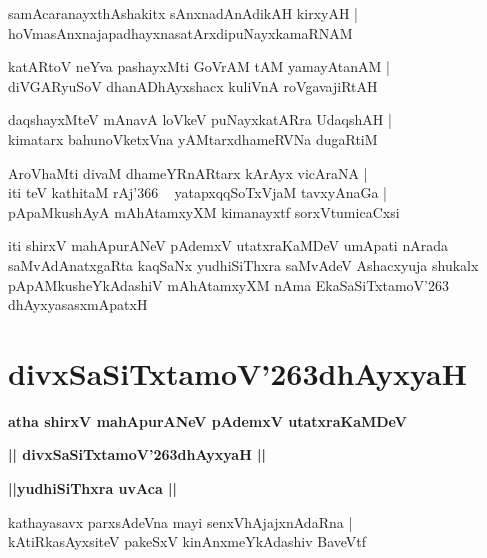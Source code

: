 \documentclass[twoside,12pt,openright]{book}
\def\S{\char'263}
\newcounter{shloka}[chapter]
\def\uvaca#1{\centerline{{\large\textbf{#1}}}}
\begin{document}
\begin{shloka}%
samAcaranayxthAshakitx sAnxnadAnAdikAH kirxyAH |\\
hoVmasAnxnajapadhayxnasatArxdipuNayxkamaRNAM 
\end{shloka}

\begin{shloka}%
katARtoV neYva pashayxMti GoVrAM tAM yamayAtanAM |\\
diVGARyuSoV dhanADhAyxshacx kuliVnA roVgavajiRtAH 
\end{shloka}

\begin{shloka}%
daqshayxMteV mAnavA loVkeV puNayxkatARra UdaqshAH |\\
kimatarx bahunoVketxVna yAMtarxdhameRVNa dugaRtiM 
\end{shloka}

\begin{shloka}%
AroVhaMti divaM dhameYRnARtarx kArAyx vicAraNA |\\
iti teV kathitaM rAj\char'366 ~ yatapxqqSoTxVjaM tavxyAnaGa |\\
pApaMkushAyA mAhAtamxyXM kimanayxtf sorxVtumicaCxsi 
\end{shloka}

\begin{center}
iti shirxV mahApurANeV pAdemxV utatxraKaMDeV umApati nArada saMvAdAnatxgaRta kaqSaNx yudhiSiThxra 
saMvAdeV Ashacxyuja shukalx pApAMkusheYkAdashiV mAhAtamxyXM nAma EkaSaSiTxtamoV\S 
dhAyxyasasxmApatxH
\end{center}

\chapter{divxSaSiTxtamoV\S dhAyxyaH}

\begin{center}
{\LARGE\bfseries atha shirxV mahApurANeV pAdemxV utatxraKaMDeV}
\end{center}

\begin{center}
{\LARGE\bfseries || divxSaSiTxtamoV\S dhAyxyaH ||}
\end{center}

\uvaca{||yudhiSiThxra uvAca ||}

\begin{shloka}%
kathayasavx parxsAdeVna mayi senxVhAjajxnAdaRna |\\
kAtiRkasAyxsiteV pakeSxV kinAnxmeYkAdashiv BaveVtf
\end{shloka}
\end{document}
